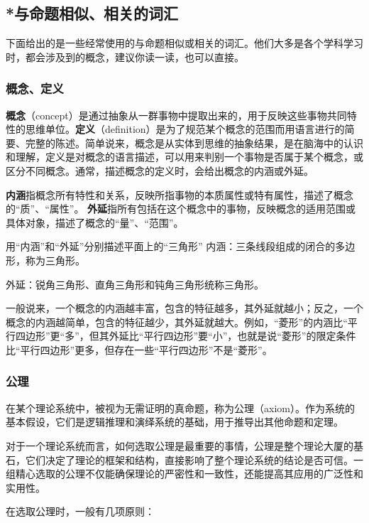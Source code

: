 \subsection{*与命题相似、相关的词汇}

下面给出的是一些经常使用的与命题相似或相关的词汇。他们大多是各个学科学习时，都会涉及到的概念，建议你读一读，也可以直接。

\subsubsection{概念、定义}

\textbf{概念}（concept）是通过抽象从一群事物中提取出来的，用于反映这些事物共同特性的思维单位。\textbf{定义}（definition）是为了规范某个概念的范围而用语言进行的简要、完整的陈述。简单说来，概念是从实体到思维的抽象结果，是在脑海中的认识和理解，定义是对概念的语言描述，可以用来判别一个事物是否属于某个概念，或区分不同概念。通常，描述概念的定义时，会给出概念的内涵或外延。

\textbf{内涵}指概念所有特性和关系，反映所指事物的本质属性或特有属性，描述了概念的“质”、“属性”。
\textbf{外延}指所有包括在这个概念中的事物，反映概念的适用范围或具体对象，描述了概念的“量”、“范围”。
\begin{example}{用“内涵”和“外延”分别描述平面上的“三角形”}
内涵：三条线段组成的闭合的多边形，称为三角形。

外延：锐角三角形、直角三角形和钝角三角形统称三角形。
\end{example}

一般说来，一个概念的内涵越丰富，包含的特征越多，其外延就越小；反之，一个概念的内涵越简单，包含的特征越少，其外延就越大。例如，“菱形”的内涵比“平行四边形”更“多”，但其外延比“平行四边形”要“小”，也就是说“菱形”的限定条件比“平行四边形”更多，但存在一些“平行四边形”不是“菱形”。

\subsubsection{公理}

在某个理论系统中，被视为无需证明的真命题，称为公理（axiom）。作为系统的基本假设，它们是逻辑推理和演绎系统的基础，用于推导出其他命题和定理。

对于一个理论系统而言，如何选取公理是最重要的事情，公理是整个理论大厦的基石，它们决定了理论的框架和结构，直接影响了整个理论系统的结论是否可信。一组精心选取的公理不仅能确保理论的严密性和一致性，还能提高其应用的广泛性和实用性。

在选取公理时，一般有几项原则：

